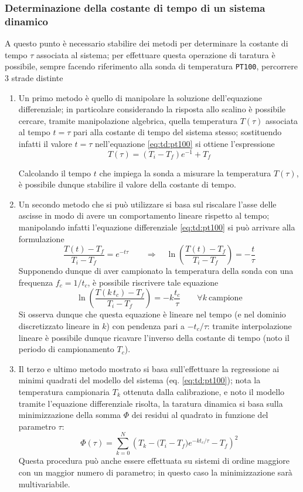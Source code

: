 		\subsubsection{Determinazione della costante di tempo di un sistema dinamico}
		A questo punto è necessario stabilire dei metodi per determinare la costante di tempo $\tau$ associata al sistema; per effettuare questa operazione di taratura è possibile, sempre facendo riferimento alla sonda di temperatura \texttt{PT100}, percorrere 3 strade distinte
		\begin{enumerate}
			\item Un primo metodo è quello di manipolare la soluzione dell'equazione differenziale; in particolare considerando la risposta allo scalino è possibile cercare, tramite manipolazione algebrica, quella temperatura $T(\tau)$ associata al tempo $t = \tau$ pari alla costante di tempo del sistema stesso; sostituendo infatti il valore $t= \tau$ nell'equazione \ref{eq:td:pt100} si ottiene l'espressione
			\[ T(\tau ) = \left(T_i- T_f\right)e^{-1} + T_f \]
			
			Calcolando il tempo $t$ che impiega la sonda a misurare la temperatura $T(\tau)$, è possibile dunque stabilire il valore della costante di tempo.
			
			\item Un secondo metodo che si può utilizzare si basa sul riscalare l'asse delle ascisse in modo di avere un comportamento lineare rispetto al tempo; manipolando infatti l'equazione differenziale \eqref{eq:td:pt100} si può arrivare alla formulazione
			\[ \frac{T(t) - T_f}{T_i-T_f} = e^{-t\tau} \qquad \Rightarrow \quad \ln \left( \frac{T(t) - T_f}{T_i-T_f}\right) = - \frac t \tau \]
			Supponendo dunque di aver campionato la temperatura della sonda con una frequenza $f_c = 1/t_c$, è possibile riscrivere tale equazione 
			\[ \ln \left( \frac{T(k \, t_c) - T_f}{T_i-T_f}\right) = - k \frac {t_c} \tau \qquad \forall k \ \textrm{campione}  \]
			Si osserva dunque che questa equazione è lineare nel tempo (e nel dominio discretizzato lineare in $k$) con pendenza pari a $-t_c/\tau$: tramite interpolazione lineare è possibile dunque ricavare l'inverso della costante di tempo (noto il periodo di campionamento $T_c$).
			
			\item Il terzo e ultimo metodo mostrato si basa sull'effettuare la regressione ai minimi quadrati del modello del sistema (eq. \ref{eq:td:pt100}); nota la temperatura campionaria $T_k$ ottenuta dalla calibrazione, e noto il modello tramite l'equazione differenziale risolta, la taratura dinamica si basa sulla minimizzazione della somma $\Phi$ dei residui al quadrato in funzione del parametro $\tau$:
			\[ \Phi(\tau) = \sum_{k=0}^N \left( T_k - \big(T_i-T_f\big)e^{-k t_c/ \tau} - T_f \right)^2 \]
			Questa procedura può anche essere effettuata su sistemi di ordine maggiore con un maggior numero di parametro; in questo caso la minimizzazione sarà multivariabile.
		\end{enumerate}
	
